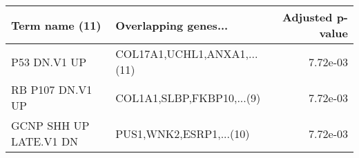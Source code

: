 \begin{tabular}{llr}
\toprule
        Term name (11) &        Overlapping genes... &  Adjusted p-value \\
\midrule
          P53 DN.V1 UP & COL17A1,UCHL1,ANXA1,...(11) &          7.72e-03 \\
      RB P107 DN.V1 UP &   COL1A1,SLBP,FKBP10,...(9) &          7.72e-03 \\
GCNP SHH UP LATE.V1 DN &     PUS1,WNK2,ESRP1,...(10) &          7.72e-03 \\
\bottomrule
\end{tabular}
